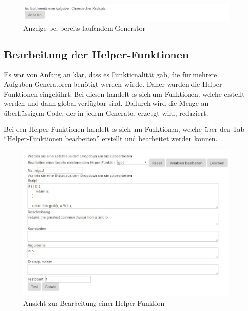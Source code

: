 \begin{figure}[htp]     %
\centering
\includegraphics[width=1\textwidth]{bilder/TaskRunning} 
\caption[Anzeige bei bereits laufendem Generator]{Anzeige bei bereits laufendem Generator}
\end{figure}


\subsection{Bearbeitung der Helper-Funktionen} \label{EditGenerator}

Es war von Anfang an klar, dass es Funktionalität gab, die für mehrere Aufgaben-Generatoren benötigt werden würde. Daher wurden die Helper-Funktionen eingeführt. Bei diesen handelt es sich um Funktionen, welche erstellt werden und dann global verfügbar sind. Dadurch wird die Menge an überflüssigem Code, der in jedem Generator erzeugt wird, reduziert.

Bei den Helper-Funktionen handelt es sich um Funktionen, welche über den Tab ``Helper-Funktionen bearbeiten'' erstellt und bearbeitet werden können. \\

\begin{figure}[htp]     %
\centering
\includegraphics[width=1\textwidth]{bilder/EditHelper} 
\caption[Ansicht zur Bearbeitung einer Helper-Funktion]{Ansicht zur Bearbeitung einer Helper-Funktion}
\end{figure} 

